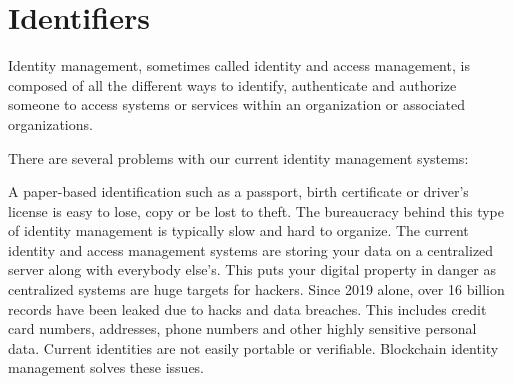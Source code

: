  
 
 
 
\section{Identifiers}



Identity management, sometimes called identity and access management, is composed of all the different ways to identify, authenticate and authorize someone to access systems or services within an organization or associated organizations. 

There are several problems with our current identity management systems:

A paper-based identification such as a passport, birth certificate or driver's license is easy to lose, copy or be lost to theft.
The bureaucracy behind this type of identity management is typically slow and hard to organize.
The current identity and access management systems are storing your data on a centralized server along with everybody else's. This puts your digital property in danger as centralized systems are huge targets for hackers.
Since 2019 alone, over 16 billion records have been leaked due to hacks and data breaches. This includes credit card numbers, addresses, phone numbers and other highly sensitive personal data.
Current identities are not easily portable or verifiable.
Blockchain identity management solves these issues. 



